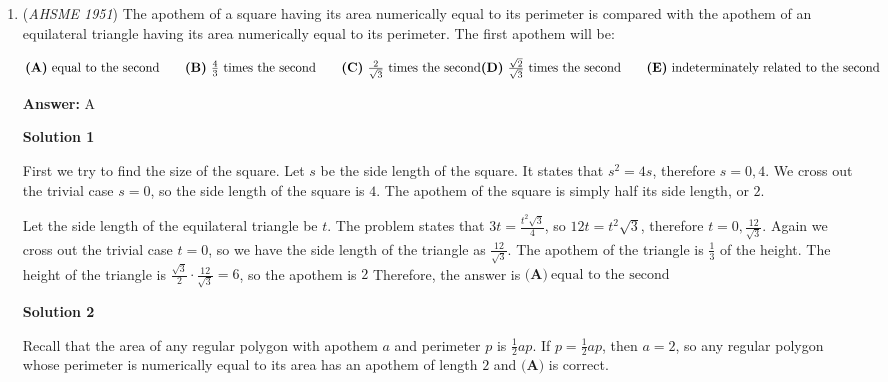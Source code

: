 \begin{enumerate}
 $\textbf{(A)}\ 2^{n+1}-\frac{1}{8}\qquad\textbf{(B)}\ -2^{n+1}\qquad\textbf{(C)}\ 1-2^{n}\qquad\textbf{(D)}\ \frac{7}{8}\qquad\textbf{(E)}\ \frac{7}{4}$

 \textbf{Answer: }D



\textbf{Solution}

We have $2(2^n)=2^{n+1}$, and $2(2^{n+3})=2^{n+4}$. Thus, $\frac{2^{n+4}-2(2^{n})}{2(2^{n+3})}=\dfrac{2^{n+4}-2^{n+1}}{2^{n+4}}$. Factoring out a $2^{n+1}$ in the numerator, we get $\dfrac{2^{n+1}(2^3-1)}{2^{n+4}}=\dfrac{8-1}{2^3}=\boxed{\textbf{(D)}\ \frac{7}{8}}$.

 


	\item (\textit{AHSME 1951}) The apothem of a square having its area numerically equal to its perimeter is compared with the apothem of an equilateral triangle having its area numerically equal to its perimeter. The first apothem will be: 


 $\textbf{(A)}\ \text{equal to the second}\qquad\textbf{(B)}\ \frac{4}{3}\text{ times the second}\qquad\textbf{(C)}\ \frac{2}{\sqrt{3}}\text{ times the second}\\ \textbf{(D)}\ \frac{\sqrt{2}}{\sqrt{3}}\text{ times the second}\qquad\textbf{(E)}\ \text{indeterminately related to the second}$

 \textbf{Answer: }A



\textbf{Solution 1}

First we try to find the size of the square. Let $s$ be the side length of the square. It states that $s^2=4s$, therefore $s=0,4$. We cross out the trivial case $s=0$, so the side length of the square is $4$. The apothem of the square is simply half its side length, or $2$.

 Let the side length of the equilateral triangle be $t$. The problem states that $3t=\frac{t^2\sqrt{3}}{4}$, so $12t=t^2\sqrt{3}$, therefore $t=0, \frac{12}{\sqrt{3}}$. Again we cross out the trivial case $t=0$, so we have the side length of the triangle as $\frac{12}{\sqrt{3}}$. The apothem of the triangle is $\frac{1}{3}$ of the height. The height of the triangle is $\frac{\sqrt{3}}{2}\cdot \frac{12}{\sqrt{3}} = 6$, so the apothem is $2$ Therefore, the answer is $\textbf{(A)}\ \text{equal to the second}$




\textbf{Solution 2}

Recall that the area of any regular polygon with apothem $a$ and perimeter $p$ is $\frac{1}{2}ap$.  If $p = \frac{1}{2}ap$, then $a = 2$, so any regular polygon whose perimeter is numerically equal to its area has an apothem of length $2$ and $\boxed{\textbf{(A)}}$ is correct.


\end{enumerate}
